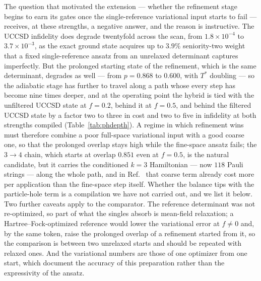 \documentclass[
  aps,            %
  prc,            %
  reprint,        %
  superscriptaddress,
  floatfix,
  nofootinbib
]{revtex4-2}
\begin{document}
The question that motivated the extension --- whether the refinement stage
begins to earn its gates once the single-reference variational input starts
to fail --- receives, at these strengths, a negative answer, and the reason
is instructive.  The UCCSD infidelity does degrade twentyfold across the
scan, from $1.8\times10^{-4}$ to $3.7\times10^{-3}$, as the exact ground
state acquires up to $3.9\%$ seniority-two weight that a fixed
single-reference ansatz from an unrelaxed determinant captures imperfectly.
But the prolonged starting state of the refinement, which is the same
determinant, degrades as well --- from $p=0.868$ to $0.600$, with $T^{*}$
doubling --- so the adiabatic stage has further to travel along a path whose
every step has become nine times deeper, and at the operating point the
hybrid is tied with the unfiltered UCCSD state at $f=0.2$, behind it at
$f=0.5$, and behind the filtered UCCSD state by a factor two to three in
cost and two to five in infidelity at both strengths compiled
(Table~\ref{tab:phdepth}).
  A regime in which refinement wins
must therefore combine a poor full-space variational input with a good
coarse one, so that the prolonged overlap stays high while the fine-space
ansatz fails; the $3\to4$ chain, which starts at overlap $0.851$ even at
$f=0.5$, is the natural candidate, but it carries the conditioned $k=3$
Hamiltonian --- now $118$ Pauli strings --- along the whole path, and in
Ref.~\cite{PairingCompanion} that coarse term already cost more per
application than the fine-space step itself.  Whether the balance tips with
the particle-hole term is a compilation we have not carried out, and we list
it below.  Two further caveats apply to the comparator.  The reference
determinant was not re-optimized, so part of what the singles absorb is
mean-field relaxation; a Hartree--Fock-optimized reference would lower the
variational error at $f\neq0$ and, by the same token, raise the prolonged
overlap of a refinement started from it, so the comparison is between two
unrelaxed starts and should be repeated with relaxed ones.  And the
variational numbers are those of one optimizer from one start, which
document the accuracy of this preparation rather than the expressivity of
the ansatz.
\end{document}
